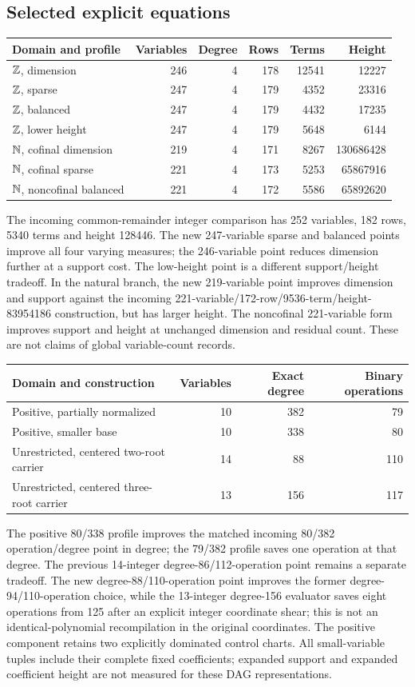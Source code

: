 \subsection{Selected explicit equations}
\begin{center}\small
\begin{tabular}{lrrrrr}\toprule
Domain and profile & Variables & Degree & Rows & Terms & Height\\\midrule
$\mathbb Z$, dimension &246&4&178&12541&12227\\
$\mathbb Z$, sparse &247&4&179&4352&23316\\
$\mathbb Z$, balanced &247&4&179&4432&17235\\
$\mathbb Z$, lower height &247&4&179&5648&6144\\\midrule
$\mathbb N$, cofinal dimension &219&4&171&8267&130686428\\
$\mathbb N$, cofinal sparse &221&4&173&5253&65867916\\
$\mathbb N$, noncofinal balanced &221&4&172&5586&65892620\\\bottomrule
\end{tabular}
\end{center}
The incoming common-remainder integer comparison has 252 variables,
182 rows, 5340 terms and height 128446. The new 247-variable sparse and
balanced points improve all four varying measures; the 246-variable
point reduces dimension further at a support cost. The low-height point
is a different support/height tradeoff. In the natural branch, the new
219-variable point improves dimension and support against the incoming
221-variable/172-row/9536-term/height-83954186 construction, but has
larger height. The noncofinal 221-variable form improves support and
height at unchanged dimension and residual count. These are not claims
of global variable-count records.

\begin{center}
\begin{tabular}{lrrr}\toprule
Domain and construction & Variables & Exact degree & Binary operations\\\midrule
Positive, partially normalized &10&382&79\\
Positive, smaller base &10&338&80\\
Unrestricted, centered two-root carrier &14&88&110\\
Unrestricted, centered three-root carrier &13&156&117\\\bottomrule
\end{tabular}
\end{center}
The positive 80/338 profile improves the matched incoming 80/382
operation/degree point in degree; the 79/382 profile saves one operation
at that degree. The previous 14-integer degree-86/112-operation point
remains a separate tradeoff. The new degree-88/110-operation point
improves the former degree-94/110-operation choice, while the
13-integer degree-156 evaluator saves eight operations from 125 after
an explicit integer coordinate shear; this is not an identical-polynomial
recompilation in the original coordinates.
The positive component retains two explicitly dominated control charts.
All small-variable tuples include their complete fixed coefficients;
expanded support and expanded coefficient height are not measured for
these DAG representations.
